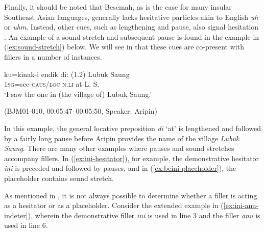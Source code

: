 \documentclass[output=paper,
\ChapterDOI{10.5281/zenodo.15697583}
colorlinks,
citecolor=brown]{langscibook}
\begin{document}
Finally, it should be noted that Besemah, as is the case for many insular Southeast Asian languages, generally lacks hesitative particles akin to English \textit{uh} or \textit{uhm}. Instead, other cues, such as lengthening and pause, also signal hesitation \citep[see][]{streeck_1996,himmelmann2014asymmetries}. An example of a sound stretch and subsequent pause is found in the example in (\ref{ex:sound-stretch}) below. We will see in  that these cues are co-present with fillers in a number of instances.

\begin{exe}
\ex\label{ex:sound-stretch} 
    \begin{xlist}
        \exi{}
        \gll ku=kinak-i endik di: (1.2) Lubuk Saung\\
        1\textsc{sg}=see-\textsc{caus/loc} \textsc{n.li} at {} L. S.\\
        \trans `I saw the one in (the village of) Lubuk Saung.'
    \end{xlist}
    \hfill (BJM01-010, 00:05:47--00:05:50, Speaker: Aripin)
\end{exe}

In this example, the general locative preposition \textit{di} `at' is lengthened and followed by a fairly long pause before Aripin provides the name of the village \textit{Lubuk Saung}. There are many other examples where pauses and sound stretches accompany fillers. In (\ref{ex:ini-hesitator}), for example, the demonstrative hesitator \textit{ini} is preceded and followed by pauses, and in (\ref{ex:beini-placeholder}), the placeholder contains sound stretch.


As mentioned in , it is not always possible to determine whether a filler is acting as a hesitator or as a placeholder. Consider the extended example in (\ref{ex:ini-anu-indeter}), wherein the demonstrative filler \textit{ini} is used in line 3 and the filler \textit{anu} is used in line 6.
\end{document}
